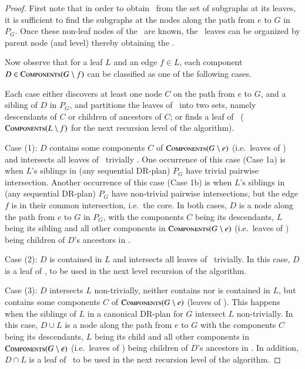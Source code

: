 \begin{proof}
    First note that in order to obtain \branchGePG\ from the set of subgraphs at its leaves, it is sufficient to find the subgraphs at the nodes along the path from $e$ to $G$ in $P_G$. Once these non-leaf nodes of the \branch\ are known, the \branch\ leaves can be organized by parent node (and level) thereby obtaining the \branch.

    Now observe that for a leaf $L$ and an edge $f\in L$, each component $D\in \textsc{Components}(G\setminus f)$ can be classified as one of the following cases.

    Each case either discovers at least one node $C$ on the path from $e$ to $G$, and a sibling of $D$ in $P_G$, and partitions the leaves of \branchGePG\ into two sets, namely descendants of $C$ or children of ancestors of $C$; or finds a leaf of \branchLfPL\ ($\textsc{Components}(L\setminus f)$ for the next recursion level of the algorithm).


    Case (1):
    $D$ contains some components $C$ of $\textsc{Components}(G\setminus e)$ (i.e.\ leaves of \branchGePG) and intersects all leaves of \branchGePG\ trivially . One occurrence of this case (Case 1a) is when $L$'s siblings in (any sequential DR-plan) $P_G$ have trivial pairwise intersection. Another occurrence of this case (Case 1b) is when $L$'s siblings in (any sequential DR-plan) $P_G$ have non-trivial pairwise intersections, but the edge $f$ is in their common intersection, i.e.\ the core. In both cases, $D$ is a node along the path from $e$ to $G$ in $P_G$, with the components $C$ being its descendants, $L$ being its sibling and all other components in $\textsc{Components}(G\setminus e)$ (i.e.\ leaves of \branchGePG) being children of $D$'s ancestors in \branchGePG.


    Case (2):
    $D$ is contained in $L$ and intersects all  leaves of \branchGePG\ trivially. In this case, $D$ is a leaf of \branchLfPL, to be used in the next level recursion of the algorithm.

    Case (3):
    $D$ intersects $L$ non-trivially, neither contains nor is contained in $L$, but contains some components $C$ of $\textsc{Components}(G\setminus e)$ (leaves of \branchGePG). This happens when the siblings of $L$ in a canonical DR-plan for $G$ intersect $L$ non-trivially. In this case, $D\cup L$ is a node along the path from $e$ to $G$ with the components $C$ being its descendants, $L$ being its  child and all other components in $\textsc{Components}(G\setminus e)$ (i.e.\ leaves of \branchGePG) being children of $D$'s ancestors in \branchGePG. In addition, $D\cap L$ is a leaf of \branchLfPL\ to be used in the next recursion level of the algorithm.


\end{proof}
